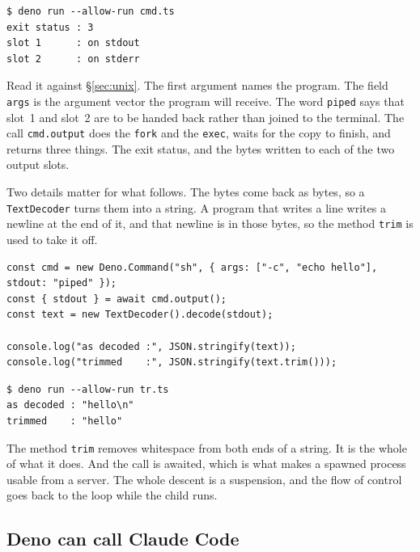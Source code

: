 \documentclass[11pt,a4paper]{article}
\begin{document}
\begin{lstlisting}[language=SH]
$ deno run --allow-run cmd.ts
exit status : 3
slot 1      : on stdout
slot 2      : on stderr
\end{lstlisting}

Read it against \S\ref{sec:unix}. The first argument names the program. The field \texttt{args} is
the argument vector the program will receive. The word \texttt{piped} says that slot~1 and slot~2
are to be handed back rather than joined to the terminal. The call \texttt{cmd.output} does the
\texttt{fork} and the \texttt{exec}, waits for the copy to finish, and returns three things. The
exit status, and the bytes written to each of the two output slots.

Two details matter for what follows. The bytes come back as bytes, so a \texttt{TextDecoder} turns
them into a string. A program that writes a line writes a newline at the end of it, and that
newline is in those bytes, so the method \texttt{trim} is used to take it off.

\begin{lstlisting}[language=TS]
const cmd = new Deno.Command("sh", { args: ["-c", "echo hello"], stdout: "piped" });
const { stdout } = await cmd.output();
const text = new TextDecoder().decode(stdout);

console.log("as decoded :", JSON.stringify(text));
console.log("trimmed    :", JSON.stringify(text.trim()));
\end{lstlisting}

\begin{lstlisting}[language=SH]
$ deno run --allow-run tr.ts
as decoded : "hello\n"
trimmed    : "hello"
\end{lstlisting}

The method \texttt{trim} removes whitespace from both ends of a string. It is the whole of what it
does. And the call is awaited, which is what makes a spawned process usable from a
server. The whole descent is a suspension, and the flow of control goes back to the loop while the
child runs.

\subsection{Deno can call Claude Code}
\end{document}
